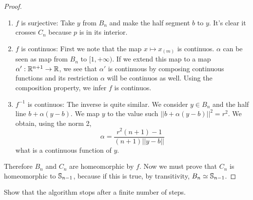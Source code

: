 \begin{proof}
\begin{enumerate}
    \item $f$ is surjective: Take $y$ from $B_n$ and make the half segment $b$ to $y$. It's clear
    it crosses $C_n$ because $p$ is in its interior.

    \item $f$ is continuos: First we note that the map $x \mapsto x_{(m)}$ is
    continuos. $\alpha$ can be seen as map from $B_n$ to $[1, + \infty)$. If
    we extend this map to a map $\alpha ' : \mathbb{R}^{n+1} \to \mathbb{R}$, we see that
    $\alpha '$ is continuous by composing continuous functions and its
    restriction $\alpha$ will be continuos as well. Using the composition
    property, we infer $f$ is continuos. 
    
    \item $f^{-1}$ is continuos: The inverse is quite similar. We consider $y
    \in B_n$ and the
    half line $b + \alpha(y - b)$. We map $y$ to the value such $||b +
    \alpha(y - b)||^2 = r^2$. We obtain, using the norm 2, 
    $$
    \alpha = \frac{r^2(n+1) -1}{(n+1)||y-b||}
    $$
    what is a continuous function of $y$. 

\end{enumerate}

Therefore $B_n$ and $C_n$ are homeomorphic by $f$. Now we must
prove that $C_n$ is homeomorphic to $\mathbb{S}_{n-1}$, because if this is true,
by transitivity, $B_n \simeq \mathbb{S}_{n-1}$. 

\end{proof}

\noindent\linia

\begin{exercise}
    Show that the algorithm stops after a finite number of steps.
\end{exercise}

